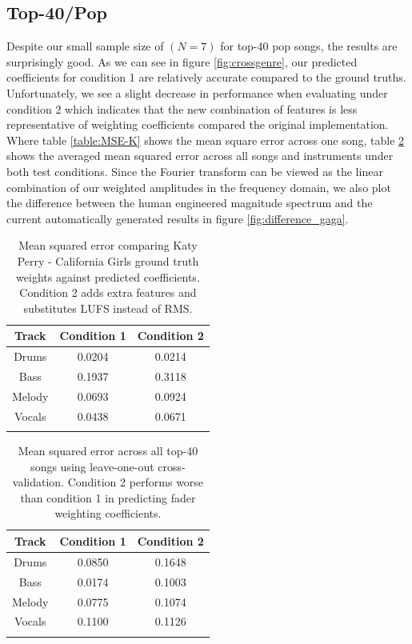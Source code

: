 \documentclass{article}
\begin{document}
\subsection{Top-40/Pop}
\label{sec:top40}

Despite our small sample size of $(N = 7)$ for top-40 pop songs, the results are surprisingly good.  As we can see in figure \ref{fig:crossgenre}, our predicted coefficients for condition 1 are relatively accurate compared to the ground truths.  Unfortunately, we see a slight decrease in performance when evaluating under condition 2 which indicates that the new combination of features is less representative of weighting coefficients compared the original implementation.  Where table \ref{table:MSE-K} shows the mean square error across one song, table \ref{table:MSE-pop} shows the averaged mean squared error across all songs and instruments under both test conditions.  Since the Fourier transform can be viewed as the linear combination of our weighted amplitudes in the frequency domain, we also plot the difference between the human engineered magnitude spectrum and the current automatically generated results in figure \ref{fig:difference_gaga}.

\begin{table}[h]
\centering
\begin{tabular}{ccc}
Track  & Condition 1 & Condition 2 \\ \hline
Drums  & 0.0204      & 0.0214      \\
Bass   & 0.1937      & 0.3118      \\
Melody & 0.0693      & 0.0924      \\
Vocals & 0.0438      & 0.0671      \\ \hline
\label{table:MSE-KP}
\end{tabular}
\caption{Mean squared error comparing Katy Perry - California Girls ground truth weights against predicted coefficients.  Condition 2 adds extra features and substitutes LUFS instead of RMS.}
\end{table}

\begin{table}[h]
\centering
\begin{tabular}{ccc}
Track  & Condition 1 & Condition 2 \\ \hline
Drums  & 0.0850      & 0.1648      \\
Bass   & 0.0174      & 0.1003      \\
Melody & 0.0775      & 0.1074      \\
Vocals & 0.1100      & 0.1126      \\ \hline
\label{table:MSE-pop}
\end{tabular}
\caption{Mean squared error across all top-40 songs using leave-one-out cross-validation.  Condition 2 performs worse than condition 1 in predicting fader weighting coefficients.}
\end{table}
\end{document}
